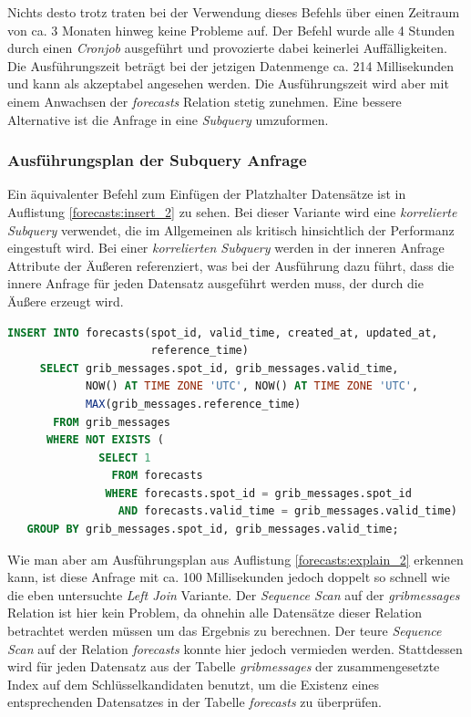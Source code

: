 Nichts desto trotz traten bei der Verwendung dieses Befehls über einen
Zeitraum von ca. 3 Monaten hinweg keine Probleme auf. Der Befehl wurde
alle 4 Stunden durch einen \textit{Cronjob} ausgeführt und provozierte
dabei keinerlei Auffälligkeiten. Die Ausführungszeit beträgt bei der
jetzigen Datenmenge ca. 214 Millisekunden und kann als akzeptabel
angesehen werden. Die Ausführungszeit wird aber mit einem Anwachsen
der \textit{forecasts} Relation stetig zunehmen. Eine bessere
Alternative ist die Anfrage in eine \textit{Subquery} umzuformen.

\subsubsection{Ausführungsplan der Subquery Anfrage}
Ein äquivalenter Befehl zum Einfügen der Platzhalter Datensätze ist in
Auflistung \ref{forecasts:insert_2} zu sehen. Bei dieser Variante wird
eine \textit{korrelierte Subquery} verwendet, die im Allgemeinen als
kritisch hinsichtlich der Performanz eingestuft wird. Bei einer
\textit{korrelierten Subquery} werden in der inneren Anfrage Attribute
der Äußeren referenziert, was bei der Ausführung dazu führt, dass die
innere Anfrage für jeden Datensatz ausgeführt werden muss, der durch
die Äußere erzeugt wird.

\begin{lstlisting}[captionpos=b, caption=Hinzufügen von Datensätzen mittels Subquery, label=forecasts:insert_2, language=SQL]
INSERT INTO forecasts(spot_id, valid_time, created_at, updated_at, 
                      reference_time)
     SELECT grib_messages.spot_id, grib_messages.valid_time, 
            NOW() AT TIME ZONE 'UTC', NOW() AT TIME ZONE 'UTC', 
            MAX(grib_messages.reference_time)
       FROM grib_messages
      WHERE NOT EXISTS (
              SELECT 1 
                FROM forecasts 
               WHERE forecasts.spot_id = grib_messages.spot_id
                 AND forecasts.valid_time = grib_messages.valid_time)
   GROUP BY grib_messages.spot_id, grib_messages.valid_time;
\end{lstlisting}

Wie man aber am Ausführungsplan aus Auflistung
\ref{forecasts:explain_2} erkennen kann, ist diese Anfrage mit ca. 100
Millisekunden jedoch doppelt so schnell wie die eben untersuchte
\textit{Left Join} Variante. Der \textit{Sequence Scan} auf der
\textit{grib\textunderscore messages} Relation ist hier kein Problem,
da ohnehin alle Datensätze dieser Relation betrachtet werden müssen um
das Ergebnis zu berechnen. Der teure \textit{Sequence Scan} auf der
Relation \textit{forecasts} konnte hier jedoch vermieden
werden. Stattdessen wird für jeden Datensatz aus der Tabelle
\textit{grib\textunderscore messages} der zusammengesetzte Index auf
dem Schlüsselkandidaten benutzt, um die Existenz eines entsprechenden
Datensatzes in der Tabelle \textit{forecasts} zu überprüfen.

